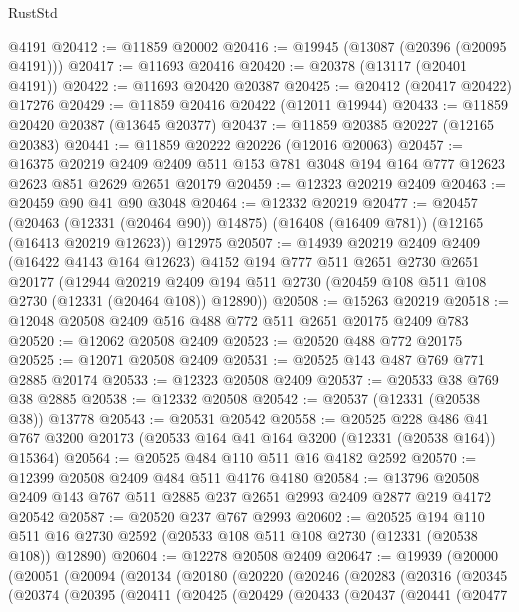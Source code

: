 \begin{lexlean}{RustStd}
\begin{coremodule}
    @4191
@20412 := @11859 @20002
@20416 := @19945 (@13087 (@20396 (@20095 @4191)))
@20417 := @11693 @20416
@20420 := @20378 (@13117 (@20401 @4191))
@20422 := @11693 @20420 @20387
@20425 := @20412 (@20417 @20422) @17276
@20429 := @11859 @20416 @20422 (@12011 @19944)
@20433 := @11859 @20420 @20387 (@13645 @20377)
@20437 := @11859 @20385 @20227 (@12165 @20383)
@20441 := @11859 @20222 @20226 (@12016 @20063)
@20457 := @16375
    @20219
    @2409
    @2409
    @511
    @153
    @781
    @3048
    @194
    @164
    @777
    @12623
    @2623
    @851
    @2629
    @2651
    @20179
@20459 := @12323 @20219 @2409
@20463 := @20459 @90 @41 @90 @3048
@20464 := @12332 @20219
@20477 := @20457
    (@20463 (@12331 (@20464 @90)) @14875)
    (@16408 (@16409 @781))
    (@12165 (@16413 @20219 @12623))
    @12975
@20507 := @14939
    @20219
    @2409
    @2409
    (@16422 @4143 @164 @12623)
    @4152
    @194
    @777
    @511
    @2651
    @2730
    @2651
    @20177
    (@12944
      @20219
      @2409
      @194
      @511
      @2730
      (@20459 @108 @511 @108 @2730 (@12331 (@20464 @108)) @12890))
@20508 := @15263 @20219
@20518 := @12048 @20508 @2409 @516 @488 @772 @511 @2651 @20175 @2409 @783
@20520 := @12062 @20508 @2409
@20523 := @20520 @488 @772 @20175
@20525 := @12071 @20508 @2409
@20531 := @20525 @143 @487 @769 @771 @2885 @20174
@20533 := @12323 @20508 @2409
@20537 := @20533 @38 @769 @38 @2885
@20538 := @12332 @20508
@20542 := @20537 (@12331 (@20538 @38)) @13778
@20543 := @20531 @20542
@20558 := @20525
    @228
    @486
    @41
    @767
    @3200
    @20173
    (@20533 @164 @41 @164 @3200 (@12331 (@20538 @164)) @15364)
@20564 := @20525 @484 @110 @511 @16 @4182 @2592
@20570 := @12399 @20508 @2409 @484 @511 @4176 @4180
@20584 := @13796 @20508 @2409 @143 @767 @511 @2885 @237 @2651 @2993 @2409 @2877 @219 @4172 @20542
@20587 := @20520 @237 @767 @2993
@20602 := @20525
    @194
    @110
    @511
    @16
    @2730
    @2592
    (@20533 @108 @511 @108 @2730 (@12331 (@20538 @108)) @12890)
@20604 := @12278 @20508 @2409
@20647 := @19939
    (@20000
      (@20051
        (@20094
          (@20134
            (@20180
              (@20220
                (@20246
                  (@20283
                    (@20316
                      (@20345
                        (@20374
                          (@20395
                            (@20411
                              (@20425
                                (@20429
                                  (@20433
                                    (@20437
                                      (@20441
                                        (@20477

\end{coremodule}
\end{lexlean}
